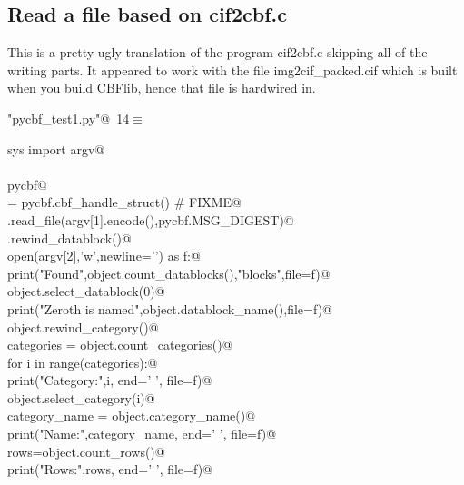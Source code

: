 \documentclass[10pt,a4paper,twoside,notitlepage]{article}
\begin{document}
\subsection{Read a file based on cif2cbf.c}

This is a pretty ugly translation of the program cif2cbf.c skipping
all of the writing parts. 
It appeared to work with the file img2cif\_packed.cif which is built
when you build CBFlib, hence that file is hardwired in.

\begin{flushleft} \small
\begin{minipage}{\linewidth}\label{scrap13}\raggedright\small
{} \verb@"pycbf_test1.py"@\nobreak\ {\footnotesize {14}}$\equiv$
\vspace{-1ex}
\begin{list}{}{} \item
\mbox{}\verb@from sys import argv@\\
\mbox{}\verb@@\\
\mbox{}\verb@import pycbf@\\
\mbox{}\verb@object = pycbf.cbf_handle_struct() # FIXME@\\
\mbox{}\verb@object.read_file(argv[1].encode(),pycbf.MSG_DIGEST)@\\
\mbox{}\verb@object.rewind_datablock()@\\
\mbox{}\verb@with open(argv[2],'w',newline='\n') as f:@\\
\mbox{}\verb@    print("Found",object.count_datablocks(),"blocks",file=f)@\\
\mbox{}\verb@    object.select_datablock(0)@\\
\mbox{}\verb@    print("Zeroth is named",object.datablock_name(),file=f)@\\
\mbox{}\verb@    object.rewind_category()@\\
\mbox{}\verb@    categories = object.count_categories()@\\
\mbox{}\verb@    for i in range(categories):@\\
\mbox{}\verb@        print("Category:",i, end=' ', file=f)@\\
\mbox{}\verb@        object.select_category(i)@\\
\mbox{}\verb@        category_name = object.category_name()@\\
\mbox{}\verb@        print("Name:",category_name, end=' ', file=f)@\\
\mbox{}\verb@        rows=object.count_rows()@\\
\mbox{}\verb@        print("Rows:",rows, end=' ', file=f)@\\

\end{list}
\end{minipage}
\end{flushleft}
\end{document}
